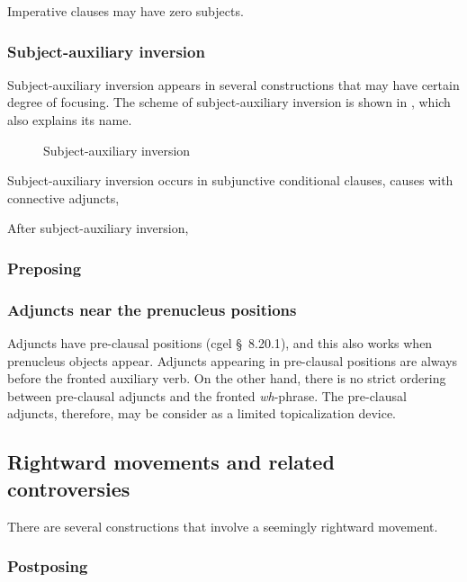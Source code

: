 \documentclass{article}
\newcommand*{\citesec}[1]{\S~{#1}}
\newcommand*{\corpus}[1]{\emph{#1}}
\begin{document}
Imperative clauses may have zero subjects.

\subsubsection{Subject-auxiliary inversion}

Subject-auxiliary inversion appears in several constructions that may have certain degree of focusing.
The scheme of subject-auxiliary inversion is shown in ,
which also explains its name.

\begin{figure}
    \centering
    
    \caption{Subject-auxiliary inversion}
    \label{fig:sai}
\end{figure}

Subject-auxiliary inversion occurs in subjunctive conditional clauses, %
causes with connective adjuncts, %

After subject-auxiliary inversion, 

\subsubsection{Preposing}

\subsubsection{Adjuncts near the prenucleus positions}

Adjuncts have pre-clausal positions (\ac{cgel} \citesec{8.20.1}), 
and this also works when prenucleus objects appear.
Adjuncts appearing in pre-clausal positions are always before the fronted auxiliary verb.
On the other hand, 
there is no strict ordering between pre-clausal adjuncts and the fronted \corpus{wh}-phrase.
The pre-clausal adjuncts, therefore, may be consider as a limited topicalization device.

\subsection{Rightward movements and related controversies}

There are several constructions that involve a seemingly rightward movement.

\subsubsection{Postposing}
\end{document}
